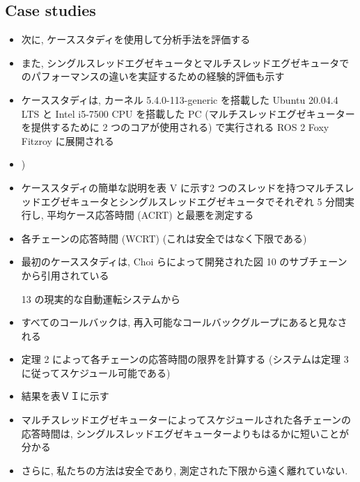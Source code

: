\subsection{Case studies}
\label{ssec: case studies}

\begin{frame}{}
    \begin{itemize}
        \item 次に, ケーススタディを使用して分析手法を評価する
\item また, シングルスレッドエグゼキュータとマルチスレッドエグゼキュータでのパフォーマンスの違いを実証するための経験的評価も示す
\item ケーススタディは, カーネル 5.4.0-113-generic を搭載した Ubuntu 20.04.4 LTS と Intel i5-7500 CPU を搭載した PC (マルチスレッドエグゼキューターを提供するために 2 つのコアが使用される) で実行される ROS 2 Foxy Fitzroy に展開される
\item )
    \end{itemize}
\end{frame}


\begin{frame}{}
    \begin{itemize}
        \item ケーススタディの簡単な説明を表 V に示す2 つのスレッドを持つマルチスレッドエグゼキュータとシングルスレッドエグゼキュータでそれぞれ 5 分間実行し, 平均ケース応答時間 (ACRT) と最悪を測定する
\item 各チェーンの応答時間 (WCRT) (これは安全ではなく下限である)
    \end{itemize}
\end{frame}

\begin{frame}{}
    \begin{itemize}
        \item 最初のケーススタディは, Choi らによって開発された図 10 のサブチェーンから引用されている
\item [13] の現実的な自動運転システムから
\item すべてのコールバックは, 再入可能なコールバックグループにあると見なされる
\item 定理 2 によって各チェーンの応答時間の限界を計算する (システムは定理 3 に従ってスケジュール可能である)
\item 結果を表ＶＩに示す
\item マルチスレッドエグゼキューターによってスケジュールされた各チェーンの応答時間は, シングルスレッドエグゼキューターよりもはるかに短いことが分かる
\item さらに, 私たちの方法は安全であり, 測定された下限から遠く離れていない.
    \end{itemize}
\end{frame}

